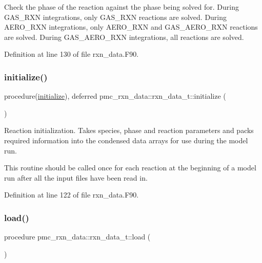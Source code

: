 Check the phase of the reaction against the phase being solved for. During G\+A\+S\+\_\+\+R\+XN integrations, only G\+A\+S\+\_\+\+R\+XN reactions are solved. During A\+E\+R\+O\+\_\+\+R\+XN integrations, only A\+E\+R\+O\+\_\+\+R\+XN and G\+A\+S\+\_\+\+A\+E\+R\+O\+\_\+\+R\+XN reactions are solved. During G\+A\+S\+\_\+\+A\+E\+R\+O\+\_\+\+R\+XN integrations, all reactions are solved. 



Definition at line 130 of file rxn\+\_\+data.\+F90.

\mbox{\label{structpmc__rxn__data_1_1rxn__data__t_aec9c7d12273468ac75acce69a13cc93f}} 
\subsubsection{\texorpdfstring{initialize()}{initialize()}}
{\footnotesize\ttfamily procedure(\mbox{\hyperlink{interfacepmc__aero__rep__data_1_1initialize}{initialize}}), deferred pmc\+\_\+rxn\+\_\+data\+::rxn\+\_\+data\+\_\+t\+::initialize (\begin{DoxyParamCaption}{ }\end{DoxyParamCaption})\hspace{0.3cm}{\ttfamily [private]}}



Reaction initialization. Takes species, phase and reaction parameters and packs required information into the condensed data arrays for use during the model run. 

This routine should be called once for each reaction at the beginning of a model run after all the input files have been read in. 

Definition at line 122 of file rxn\+\_\+data.\+F90.

\mbox{\label{structpmc__rxn__data_1_1rxn__data__t_a2c8a108bceb0fb35cfb0f861ef16ead0}} 
\subsubsection{\texorpdfstring{load()}{load()}}
{\footnotesize\ttfamily procedure pmc\+\_\+rxn\+\_\+data\+::rxn\+\_\+data\+\_\+t\+::load (\begin{DoxyParamCaption}{ }\end{DoxyParamCaption})\hspace{0.3cm}{\ttfamily [private]}}



